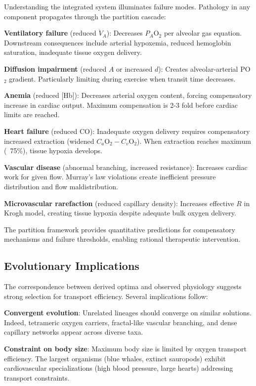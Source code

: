 Understanding the integrated system illuminates failure modes. Pathology in any component propagates through the partition cascade:

\textbf{Ventilatory failure} (reduced $\dot{V}_{A}$): Decreases $P_{A}\mathrm{O}_{2}$ per alveolar gas equation. Downstream consequences include arterial hypoxemia, reduced hemoglobin saturation, inadequate tissue oxygen delivery.

\textbf{Diffusion impairment} (reduced $A$ or increased $d$): Creates alveolar-arterial PO$_{2}$ gradient. Particularly limiting during exercise when transit time decreases.

\textbf{Anemia} (reduced [Hb]): Decreases arterial oxygen content, forcing compensatory increase in cardiac output. Maximum compensation is 2-3 fold before cardiac limits are reached.

\textbf{Heart failure} (reduced CO): Inadequate oxygen delivery requires compensatory increased extraction (widened $C_{a}\mathrm{O}_{2} - C_{v}\mathrm{O}_{2}$). When extraction reaches maximum (~75\%), tissue hypoxia develops.

\textbf{Vascular disease} (abnormal branching, increased resistance): Increases cardiac work for given flow. Murray's law violations create inefficient pressure distribution and flow maldistribution.

\textbf{Microvascular rarefaction} (reduced capillary density): Increases effective $R$ in Krogh model, creating tissue hypoxia despite adequate bulk oxygen delivery.

The partition framework provides quantitative predictions for compensatory mechanisms and failure thresholds, enabling rational therapeutic intervention.

\subsection{Evolutionary Implications}

The correspondence between derived optima and observed physiology suggests strong selection for transport efficiency. Several implications follow:

\textbf{Convergent evolution}: Unrelated lineages should converge on similar solutions. Indeed, tetrameric oxygen carriers, fractal-like vascular branching, and dense capillary networks appear across diverse taxa.

\textbf{Constraint on body size}: Maximum body size is limited by oxygen transport efficiency. The largest organisms (blue whales, extinct sauropods) exhibit cardiovascular specializations (high blood pressure, large hearts) addressing transport constraints.

